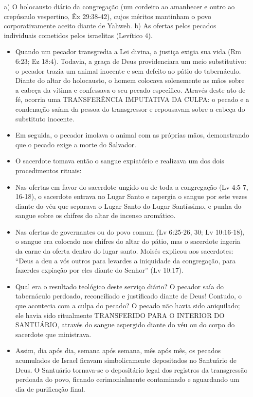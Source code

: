 a) O holocausto diário da congregação (um cordeiro ao amanhecer e outro ao crepúsculo vespertino, Êx 29:38-42), cujos méritos mantinham o povo corporativamente aceito diante de Yahweh.
b) As ofertas pelos pecados individuais cometidos pelos israelitas (Levítico 4).
\begin{itemize}
  \item Quando um pecador transgredia a Lei divina, a justiça exigia sua vida (Rm 6:23; Ez 18:4). Todavia, a graça de Deus providenciara um meio substitutivo: o pecador trazia um animal inocente e sem defeito ao pátio do tabernáculo. Diante do altar do holocausto, o homem colocava solenemente as mãos sobre a cabeça da vítima e confessava o seu pecado específico. Através deste ato de fé, ocorria uma TRANSFERÊNCIA IMPUTATIVA DA CULPA: o pecado e a condenação saíam da pessoa do transgressor e repousavam sobre a cabeça do substituto inocente.
  \item Em seguida, o pecador imolava o animal com as próprias mãos, demonstrando que o pecado exige a morte do Salvador.
  \item O sacerdote tomava então o sangue expiatório e realizava um dos dois procedimentos rituais:
  \item Nas ofertas em favor do sacerdote ungido ou de toda a congregação (Lv 4:5-7, 16-18), o sacerdote entrava no Lugar Santo e aspergia o sangue por sete vezes diante do véu que separava o Lugar Santo do Lugar Santíssimo, e punha do sangue sobre os chifres do altar de incenso aromático.
  \item Nas ofertas de governantes ou do povo comum (Lv 6:25-26, 30; Lv 10:16-18), o sangue era colocado nos chifres do altar do pátio, mas o sacerdote ingeria da carne da oferta dentro do lugar santo. Moisés explicou aos sacerdotes: ``Deus a deu a vós outros para levardes a iniquidade da congregação, para fazerdes expiação por eles diante do Senhor'' (Lv 10:17).
  \item Qual era o resultado teológico deste serviço diário? O pecador saía do tabernáculo perdoado, reconciliado e justificado diante de Deus! Contudo, o que acontecia com a culpa do pecado? O pecado não havia sido aniquilado; ele havia sido ritualmente TRANSFERIDO PARA O INTERIOR DO SANTUÁRIO, através do sangue aspergido diante do véu ou do corpo do sacerdote que ministrava.
  \item Assim, dia após dia, semana após semana, mês após mês, os pecados acumulados de Israel ficavam simbolicamente depositados no Santuário de Deus. O Santuário tornava-se o depositário legal dos registros da transgressão perdoada do povo, ficando cerimonialmente contaminado e aguardando um dia de purificação final.
\end{itemize}


